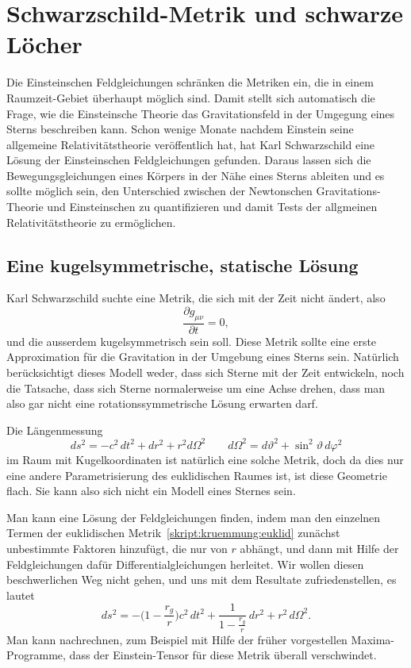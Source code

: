 %
%
%
\chapter{Schwarzschild-Metrik und schwarze Löcher%
\label{skript:chapter:schwarzschild}}
\rhead{}
Die Einsteinschen Feldgleichungen schränken die Metriken ein,
die in einem Raumzeit-Gebiet über\-haupt möglich sind.
Damit stellt sich automatisch die Frage, wie die Einsteinsche Theorie 
das Gravitationsfeld in der Umgegung eines Sterns beschreiben kann.
Schon wenige Monate nachdem Einstein seine allgemeine Relativitätstheorie
veröffentlich hat, hat Karl Schwarzschild eine Lösung der Einsteinschen
Feldgleichungen gefunden.
Daraus lassen sich die Bewegungsgleichungen eines Körpers in der Nähe
eines Sterns ableiten und es sollte möglich sein, den Unterschied zwischen
der Newtonschen Gravitations-Theorie und Einsteinschen  zu quantifizieren
und damit Tests der allgmeinen Relativitätstheorie zu ermöglichen.

\section{Eine kugelsymmetrische, statische Lösung}
\label{skript:schwarzschild:kugelsymmetrischeloesung}
Karl Schwarzschild suchte eine Metrik, die sich mit der Zeit nicht ändert,
also
\[
\frac{\partial g_{\mu\nu}}{\partial t}=0,
\]
und die ausserdem kugelsymmetrisch sein soll.
Diese Metrik sollte eine erste Approximation für die Gravitation in
der Umgebung eines Sterns sein.
Natürlich berücksichtigt dieses Modell weder, dass sich Sterne mit
der Zeit entwickeln, noch die Tatsache, dass sich Sterne normalerweise
um eine Achse drehen, dass man also gar nicht eine rotationssymmetrische
Lösung erwarten darf.

Die Längenmessung
\begin{equation}
ds^2
=
-c^2\,dt^2 + dr^2 + r^2 d\Omega^2
\qquad
d\Omega^2 = d\vartheta^2 + \sin^2\vartheta\,d\varphi^2
\label{skript:kruemmung:euklid}
\end{equation}
im Raum mit Kugelkoordinaten ist natürlich eine solche Metrik,
doch da dies nur eine andere Parametrisierung des euklidischen
Raumes ist, ist diese Geometrie flach.
Sie kann also sich nicht ein Modell eines Sternes sein.

Man kann eine Lösung der Feldgleichungen finden, indem man den
einzelnen Termen der euklidischen Metrik~\eqref{skript:kruemmung:euklid}
zunächst unbestimmte Faktoren hinzufügt, die nur von $r$ abhängt,
und dann mit Hilfe der Feldgleichungen dafür Differentialgleichungen
herleitet.
Wir wollen diesen beschwerlichen Weg nicht gehen, und uns mit dem
Resultate zufriedenstellen, es lautet
\begin{equation}
ds^2
=
-\biggl(1-\frac{r_g}r\biggr)c^2\,dt^2
+\frac1{\displaystyle 1-\frac{r_g}r}\,dr^2 + r^2\,d\Omega^2.
\label{skript:kruemmung:schwarzschildmetrik}
\end{equation}
Man kann nachrechnen, zum Beispiel mit Hilfe der früher vorgestellen
Maxima-Programme, dass der Einstein-Tensor für diese Metrik überall
verschwindet.

